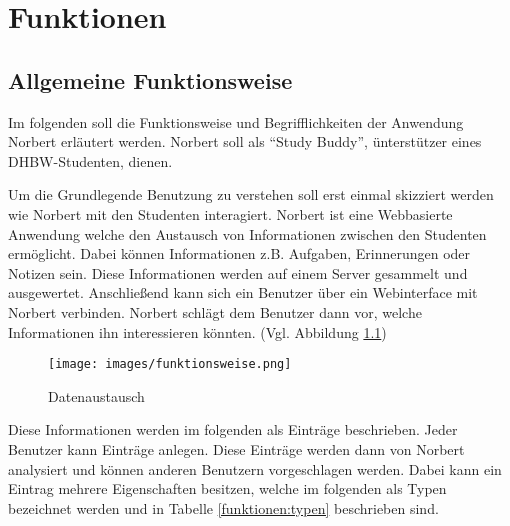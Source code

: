 \chapter{Funktionen}

\section{Allgemeine Funktionsweise}

Im folgenden soll die Funktionsweise und Begrifflichkeiten der Anwendung Norbert erläutert werden.
Norbert soll als \enquote{Study Buddy}, ünterstützer eines DHBW-Studenten, dienen.

Um die Grundlegende Benutzung zu verstehen soll erst einmal skizziert werden wie Norbert mit den Studenten interagiert.
Norbert ist eine Webbasierte Anwendung welche den Austausch von Informationen zwischen den Studenten ermöglicht.
Dabei können Informationen z.B. Aufgaben, Erinnerungen oder Notizen sein.
Diese Informationen werden auf einem Server gesammelt und ausgewertet.
Anschließend kann sich ein Benutzer über ein Webinterface mit Norbert verbinden.
Norbert schlägt dem Benutzer dann vor, welche Informationen ihn interessieren könnten. (Vgl. Abbildung \ref{funktionen:datenaustausch})

\begin{figure}[H]
    \centering
    \texttt{[image: images/funktionsweise.png]}
    \caption{Datenaustausch}
    \label{funktionen:datenaustausch}
\end{figure}

Diese Informationen werden im folgenden als Einträge beschrieben.
Jeder Benutzer kann Einträge anlegen. Diese Einträge werden dann von Norbert analysiert und können anderen Benutzern vorgeschlagen werden.
Dabei kann ein Eintrag mehrere Eigenschaften besitzen, welche im folgenden als Typen bezeichnet werden und in Tabelle \ref{funktionen:typen} beschrieben sind.

